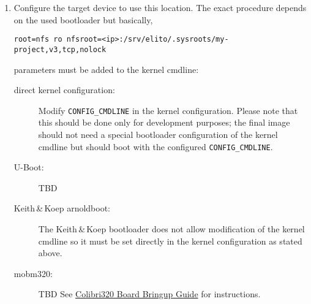   \begin{enumerate}[resume]
  \item Configure the target device to use this location.  The exact
    procedure depends on the used bootloader but basically,
\begin{verbatim}
root=nfs ro nfsroot=<ip>:/srv/elito/.sysroots/my-project,v3,tcp,nolock
\end{verbatim}
    parameters must be added to the kernel cmdline:

    \begin{description}
    \item[direct kernel configuration:] Modify
      \texttt{CONFIG\_CMDLINE} in the kernel configuration.  Please
      note that this should be done only for development purposes; the
      final image should not need a special bootloader configuration
      of the kernel cmdline but should boot with the configured
      \texttt{CONFIG\_CMDLINE}.
    \item[U-Boot:] TBD
    \item[Keith\,\&\,Koep arnoldboot:] The Keith\,\&\,Koep bootloader
      does not allow modification of the kernel cmdline so it must be
      set directly in the kernel configuration as stated above.
    \item[mobm320:] TBD
      See \href{https://www.cvg.de/people/ensc/pxa320/BoardBringUp.html}{Colibri320 Board Bringup Guide} for instructions.
    \end{description}
  \end{enumerate}


